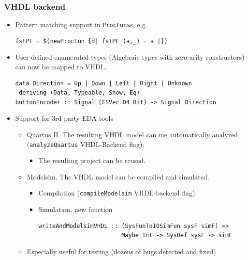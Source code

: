 \documentclass{beamer}
\begin{document}
\begin{frame}[fragile]
  \frametitle{VHDL backend}
  \begin{itemize}
  \item<1-> Pattern matching support in \texttt{ProcFuns}s, e.g.
\begin{lstlisting}
fstPF = $(newProcFun [d| fstPF (a,_) = a |])
\end{lstlisting}
  \item<2-> User-defined enumerated types (Algebraic types with
    zero-arity constructors) can now be mapped to VHDL.
\begin{lstlisting}
data Direction = Up | Down | Left | Right | Unknown
 deriving (Data, Typeable, Show, Eq)
buttonEncoder :: Signal (FSVec D4 Bit) -> Signal Direction
\end{lstlisting}    
    
  \item<3-> Support for 3rd party EDA tools
    \begin{itemize}
      \item<3-> Quartus II. The resulting VHDL model can me
        automatically analyzed (\texttt{analyzeQuartus} VHDL-Backend flag).
        \begin{itemize}
        \item<3-> The resulting project can be reused.
        \end{itemize}
      \item<4-> Modelsim. The VHDL model can be compiled and
        simulated.
        \begin{itemize}
          \item<5-> Compilation (\texttt{compileModelsim} VHDL-backend flag).
          \item<6-> Simulation, new function
\begin{lstlisting}
writeAndModelsimVHDL :: (SysFunToIOSimFun sysF simF) =>
                        Maybe Int -> SysDef sysF -> simF
\end{lstlisting}            
          \end{itemize}
        \item<7-> Especially useful for testing (dozens of bugs detected
          and fixed)
    \end{itemize}
  \end{itemize}
  
\end{frame}
\end{document}
